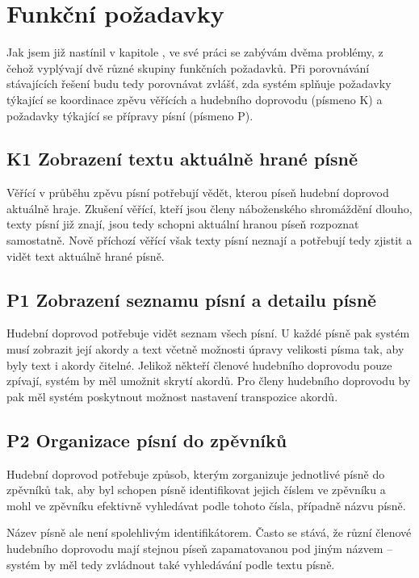 \section{Funkční požadavky}

Jak jsem již nastínil v kapitole , ve své práci se zabývám dvěma problémy, z čehož vyplývají dvě různé skupiny funkčních požadavků. Při porovnávání stávajících řešení budu tedy porovnávat zvlášť, zda systém splňuje požadavky týkající se koordinace zpěvu věřících a hudebního doprovodu (písmeno K) a požadavky týkající se přípravy písní (písmeno P).

\subsection{K1 Zobrazení textu aktuálně hrané písně}
\label{zobrazeni-textu-hrane-pisne}

Věřící v průběhu zpěvu písní potřebují vědět, kterou píseň hudební doprovod aktuálně hraje. Zkušení věřící, kteří jsou členy náboženského shromáždění dlouho, texty písní již znají, jsou tedy schopni aktuální hranou píseň rozpoznat samostatně. Nově příchozí věřící však texty písní neznají a potřebují tedy zjistit a vidět text aktuálně hrané písně.

\subsection{P1 Zobrazení seznamu písní a detailu písně}
\label{zobrazeni-seznamu-pisni-detailu}

Hudební doprovod potřebuje vidět seznam všech písní. U každé písně pak systém musí zobrazit její akordy a text včetně možnosti úpravy velikosti písma tak, aby byly text i akordy čitelné. Jelikož někteří členové hudebního doprovodu  pouze zpívají, systém by měl umožnit skrytí akordů. Pro členy hudebního doprovodu by pak měl systém poskytnout možnost nastavení transpozice akordů.

\subsection{P2 Organizace písní do zpěvníků}
\label{organizace-pisni-do-zpevniku}

Hudební doprovod potřebuje způsob, kterým zorganizuje jednotlivé písně do zpěvníků tak, aby byl schopen písně identifikovat jejich číslem ve zpěvníku a mohl ve zpěvníku efektivně vyhledávat podle tohoto čísla, případně názvu písně.

Název písně ale není spolehlivým identifikátorem. Často se stává, že různí členové hudebního doprovodu mají stejnou píseň zapamatovanou pod jiným názvem -- systém by měl tedy zvládnout také vyhledávání podle textu písně.

